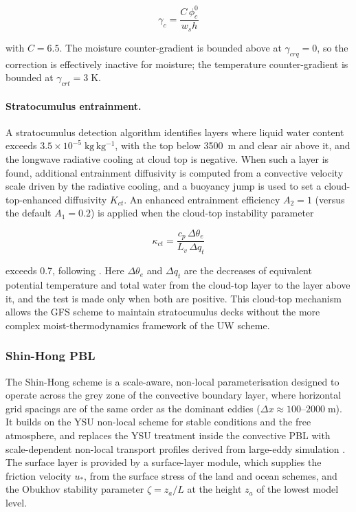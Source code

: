 \begin{equation}
  \gamma_c = \frac{C\,\phi_c^0}{w_s h}
\end{equation}

with $C=6.5$. The moisture counter-gradient is bounded above at
$\gamma_{crq} = 0$, so the correction is effectively inactive for moisture;
the temperature counter-gradient is bounded at $\gamma_{crt} = 3\;\mathrm{K}$.

\paragraph{Stratocumulus entrainment.}
A stratocumulus detection algorithm identifies layers where liquid water content
exceeds $3.5\times10^{-5}\;\mathrm{kg\,kg^{-1}}$, with the top below 3500~m
and clear air above it, and the longwave radiative cooling at cloud top is
negative.  When such a layer is found, additional
entrainment diffusivity is computed from a convective velocity scale driven by
the radiative cooling, and a buoyancy jump is used to set a
cloud-top-enhanced diffusivity $K_{ct}$.  An enhanced entrainment efficiency
$A_2 = 1$ (versus the default $A_1 = 0.2$) is applied when the cloud-top
instability parameter

\begin{equation}
  \kappa_{ct} = \frac{c_p\,\Delta\theta_e}{L_v\,\Delta q_t}
\end{equation}

exceeds 0.7, following \cite{Han_11}.  Here $\Delta\theta_e$ and $\Delta q_t$
are the decreases of equivalent potential temperature and total water from
the cloud-top layer to the layer above it, and the test is made only when
both are positive.  This cloud-top mechanism allows
the GFS scheme to maintain stratocumulus decks without the more complex
moist-thermodynamics framework of the UW scheme.

\subsubsection{Shin-Hong PBL}

The Shin-Hong scheme \citep{Shin_15} is a scale-aware, non-local
parameterisation designed to operate across the grey zone of the convective
boundary layer, where horizontal grid spacings are of the same order as
the dominant eddies ($\Delta x \approx 100$--$2000\;\mathrm{m}$).  It builds
on the YSU non-local scheme \citep{Hong_06} for stable conditions and the free
atmosphere, and replaces the YSU treatment inside the convective PBL with
scale-dependent non-local transport profiles derived from large-eddy simulation
\citep{Shin_13}.  The surface layer is provided by a
surface-layer module, which supplies the friction velocity $u_*$, from the
surface stress of the land and ocean schemes, and the Obukhov stability
parameter $\zeta = z_a/L$ at the height $z_a$ of the lowest model level.

